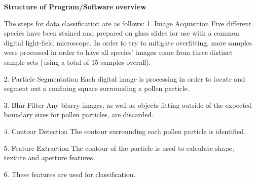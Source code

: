 \textbf{Structure of Program/Software overview} 

The steps for data classification are as follows:
1. Image Acquisition
Five different species have been stained and prepared on glass slides for use with a common digital light-field microscope.  In order to try to mitigate  overfitting, more samples were processed in order to have all species' images come from three distinct sample sets (using a total of 15 samples overall). 

2. Particle Segmentation
Each digital image is processing in order to locate and segment out a confining square surrounding a pollen particle.

3. Blur Filter
Any blurry images, as well as objects fitting outside of the expected boundary sizes for pollen particles, are discarded.

4. Contour Detection
The contour surrounding each pollen particle is identified.

5. Feature Extraction
The contour of the particle is used to calculate shape, texture and aperture features.

6. These features are used for classification.

    
    
    
    
    
    
    
    
    
    
    
    
    
    
    
  
  